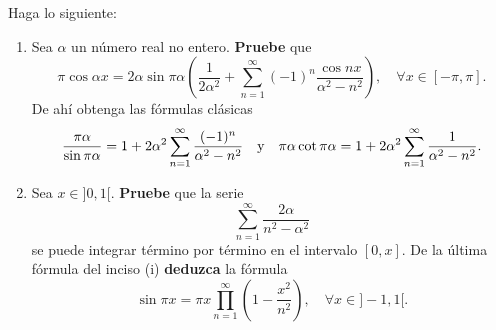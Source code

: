 \documentclass[12pt]{report}
\newcounter{it}
\theoremstyle{largebreak}
\begin{document}
    \begin{excer}
        Haga lo siguiente:
        \begin{enumerate}
            \item Sea $\alpha$ un número real no entero. \textbf{Pruebe} que
            \begin{equation*}
                \pi\cos\alpha x=2\alpha\sin\pi\alpha\left(\frac{1}{2\alpha^2}+\sum_{ n=1}^\infty(-1)^n\frac{\cos nx}{\alpha^2-n^2} \right),\quad\forall x\in[-\pi,\pi].
            \end{equation*}
            De ahí obtenga las fórmulas clásicas
            \begin{equation*}
                \frac{\pi\alpha}{\sin\pi\alpha}=1+2\alpha^2\sum_{ n=1}^\infty\frac{(-1)^n}{\alpha^2-n^2}\quad\textup{y}\quad\pi\alpha\cot\pi\alpha=1+2\alpha^2\sum_{ n=1}^\infty\frac{1}{\alpha^2-n^2}.
            \end{equation*}
            \item Sea $x\in]0,1[$. \textbf{Pruebe} que la serie
            \begin{equation*}
                \sum_{ n=1}^\infty\frac{2\alpha}{n^2-\alpha^2}
            \end{equation*}
            se puede integrar término por término en el intervalo $[0,x]$. De la última fórmula del inciso (i) \textbf{deduzca} la fórmula
            \begin{equation*}
                \sin\pi x=\pi x\prod_{ n=1}^\infty\left(1-\frac{x^2}{n^2} \right),\quad\forall x\in]-1,1[.
            \end{equation*}
        \end{enumerate}
    \end{excer}
\end{document}
